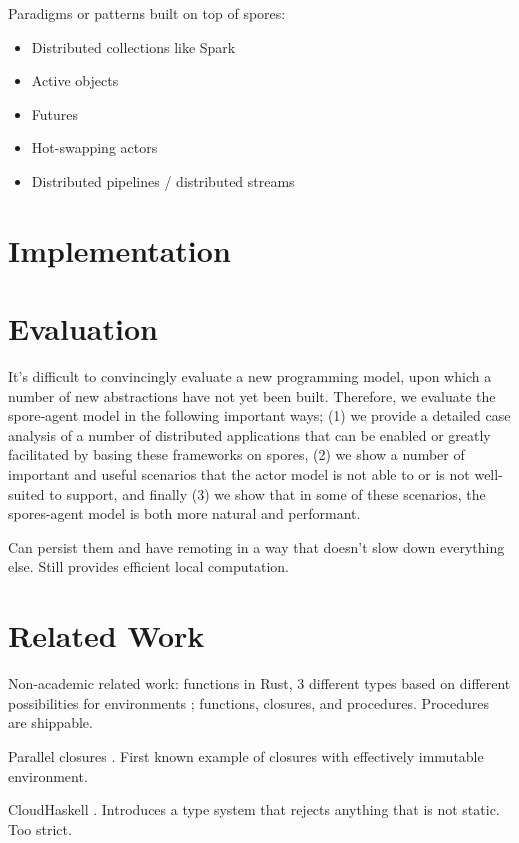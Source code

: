 \documentclass{llncs}
\begin{document}
Paradigms or patterns built on top of spores:

\begin{itemize}
\item Distributed collections like Spark
\item Active objects
\item Futures
\item Hot-swapping actors
\item Distributed pipelines / distributed streams
\end{itemize}

\section{Implementation}

\section{Evaluation}

It's difficult to convincingly evaluate a new programming model, upon which a number of new abstractions have not yet been built. Therefore, we evaluate the spore-agent model in the following important ways; (1) we provide a detailed case analysis of a number of distributed applications that can be enabled or greatly facilitated by basing these frameworks on spores, (2) we show a number of important and useful scenarios that the actor model is not able to or is not well-suited to support, and finally (3) we show that in some of these scenarios, the spores-agent model is both more natural and performant.

Can persist them and have remoting in a way that doesn't slow down everything else. Still provides efficient local computation.

\section{Related Work}

Non-academic related work: functions in Rust, 3 different types based on
different possibilities for environments \cite{RustFunctions}; functions,
closures, and procedures. Procedures are shippable.

Parallel closures \cite{ParallelClosures}. First known example of closures
with effectively immutable environment.

CloudHaskell \cite{CloudHaskell}. Introduces a type system that rejects anything
that is not static. Too strict.
\end{document}
